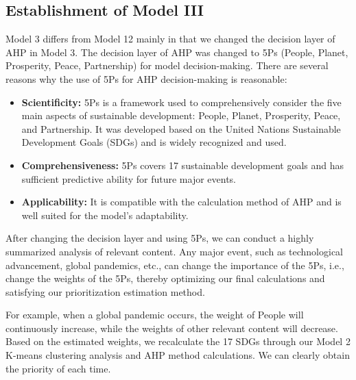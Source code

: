 \subsection{Establishment of Model III}
Model 3 differs from Model 12 mainly in that we changed the decision layer of AHP in Model 3. The decision layer of AHP was changed to 5Ps (People, Planet, Prosperity, Peace, Partnership) for model decision-making. There are several reasons why the use of 5Ps for AHP decision-making is reasonable:

\begin{itemize}
\item \textbf{Scientificity:} 5Ps is a framework used to comprehensively consider the five main aspects of sustainable development: People, Planet, Prosperity, Peace, and Partnership. It was developed based on the United Nations Sustainable Development Goals (SDGs) and is widely recognized and used.
\item \textbf{Comprehensiveness:} 5Ps covers 17 sustainable development goals and has sufficient predictive ability for future major events.
\item \textbf{Applicability:} It is compatible with the calculation method of AHP and is well suited for the model's adaptability.
\end{itemize}

After changing the decision layer and using 5Ps, we can conduct a highly summarized analysis of relevant content. Any major event, such as technological advancement, global pandemics, etc., can change the importance of the 5Ps, i.e., change the weights of the 5Ps, thereby optimizing our final calculations and satisfying our prioritization estimation method.

For example, when a global pandemic occurs, the weight of People will continuously increase, while the weights of other relevant content will decrease. Based on the estimated weights, we recalculate the 17 SDGs through our Model 2 K-means clustering analysis and AHP method calculations. We can clearly obtain the priority of each time.


